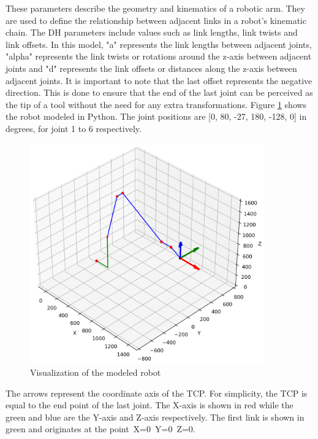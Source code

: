 These parameters describe the geometry and kinematics of a robotic arm. They are used to define the relationship between adjacent links in a robot's kinematic chain. The DH parameters include values such as link lengths, link twists and link offsets. In this model, "a" represents the link lengths between adjacent joints, "alpha" represents the link twists or rotations around the z-axis between adjacent joints and "d" represents the link offsets or distances along the z-axis between adjacent joints. 
It is important to note that the last offset represents the negative direction. This is done to ensure that the end of the last joint can be perceived as the tip of a tool without the need for any extra transformations.
Figure \ref{robotprog} shows the robot modeled in Python. The joint positions are [0, 80, -27, 180, -128, 0] in degrees, for joint 1 to 6 respectively.

 \begin{figure}[H]
	\centerline{\includegraphics[width=0.9\textwidth]{figures/robotprog.png}}
	\caption{Visualization of the modeled robot}
	\label{robotprog}
\end{figure}


The arrows represent the coordinate axis of the TCP. For simplicity, the TCP is equal to the end point of the last joint. The X-axis is shown in red while the green and blue are the Y-axis and Z-axis respectively. The first link is shown in green and originates at the point~X=0~Y=0~Z=0.


